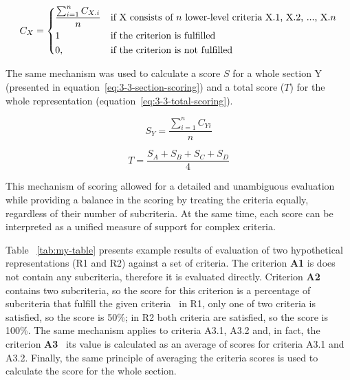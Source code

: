 \begin{equation}
    C_X =
\begin{dcases}
    \frac{\sum_{i=1}^{n} C_{X.i}}{n} & \text{if X consists of $n$ lower-level criteria X.1, X.2, ..., X.$n$}\\
    1                            & \text{if the criterion is fulfilled}\\
    0,                           & \text{if the criterion is not fulfilled}
\end{dcases}
    \label{eq:3-3-criterion-scoring}
\end{equation}

The same mechanism was used to calculate a score $S$ for a whole section Y (presented in equation~\ref{eq:3-3-section-scoring}) and a total score ($T$) for the whole representation (equation~\ref{eq:3-3-total-scoring}).

\begin{equation}
    S_Y = \frac{\sum_{i=1}^{n} C_{Yi}}{n}
    \label{eq:3-3-section-scoring}
\end{equation}

\begin{equation}
    T = \frac{S_A + S_B + S_C + S_D}{4}
    \label{eq:3-3-total-scoring}
\end{equation}

This mechanism of scoring allowed for a detailed and unambiguous evaluation while providing a balance in the scoring by treating the criteria equally, regardless of their number of subcriteria.
At the same time, each score can be interpreted as a unified measure of support for complex criteria.

Table ~\ref{tab:my-table} presents example results of evaluation of two hypothetical representations (R1 and R2) against a set of criteria.
The criterion \textbf{A1} is does not contain any subcriteria, therefore it is evaluated directly.
Criterion \textbf{A2} contains two subcriteria, so the score for this criterion is a percentage of subcriteria that fulfill the given criteria \textendash\ in R1, only one of two criteria is satisfied, so the score is 50\%; in R2 both criteria are satisfied, so the score is 100\%.
The same mechanism applies to criteria A3.1, A3.2 and, in fact, the criterion \textbf{A3} \textendash\ its value is calculated as an average of scores for criteria A3.1 and A3.2.
Finally, the same principle of averaging the criteria scores is used to calculate the score for the whole section.

